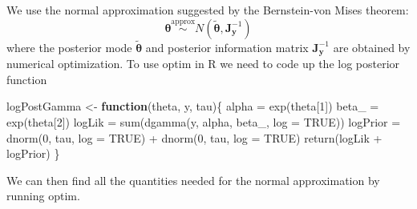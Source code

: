 \documentclass[
  letterpaper,
  DIV=11,
  numbers=noendperiod]{scrartcl}
\newenvironment{Shaded}{\begin{snugshade}}{\end{snugshade}}
\newcommand{\AttributeTok}[1]{\textcolor[rgb]{0.40,0.45,0.13}{#1}}
\newcommand{\ConstantTok}[1]{\textcolor[rgb]{0.56,0.35,0.01}{#1}}
\newcommand{\ControlFlowTok}[1]{\textcolor[rgb]{0.00,0.23,0.31}{\textbf{#1}}}
\newcommand{\DecValTok}[1]{\textcolor[rgb]{0.68,0.00,0.00}{#1}}
\newcommand{\FunctionTok}[1]{\textcolor[rgb]{0.28,0.35,0.67}{#1}}
\newcommand{\NormalTok}[1]{\textcolor[rgb]{0.00,0.23,0.31}{#1}}
\newcommand{\OtherTok}[1]{\textcolor[rgb]{0.00,0.23,0.31}{#1}}
\newcommand{\SpecialCharTok}[1]{\textcolor[rgb]{0.37,0.37,0.37}{#1}}
\begin{document}
\begin{tcolorbox}[enhanced jigsaw, arc=.35mm, bottomrule=.15mm, bottomtitle=1mm, breakable, colback=white, colbacktitle=quarto-callout-note-color!10!white, colframe=quarto-callout-note-color-frame, coltitle=black, left=2mm, leftrule=.75mm, opacityback=0, opacitybacktitle=0.6, rightrule=.15mm, title={Solution}, titlerule=0mm, toprule=.15mm, toptitle=1mm]

We use the normal approximation suggested by the Bernstein-von Mises
theorem: \[
\boldsymbol{\theta} \overset{\mathrm{approx}}{\sim} N(\tilde{\boldsymbol{\theta}}, \boldsymbol{J}^{-1}_{\mathbf{y}})
\] where the posterior mode \(\tilde{\boldsymbol{\theta}}\) and
posterior information matrix \(\boldsymbol{J}^{-1}_{\mathbf{y}}\) are
obtained by numerical optimization. To use optim in R we need to code up
the log posterior function

\begin{Shaded}
\begin{Highlighting}[]
\NormalTok{logPostGamma }\OtherTok{\textless{}{-}} \ControlFlowTok{function}\NormalTok{(theta, y, tau)\{}
\NormalTok{  alpha }\OtherTok{=} \FunctionTok{exp}\NormalTok{(theta[}\DecValTok{1}\NormalTok{])}
\NormalTok{  beta\_ }\OtherTok{=} \FunctionTok{exp}\NormalTok{(theta[}\DecValTok{2}\NormalTok{])}
\NormalTok{  logLik }\OtherTok{=} \FunctionTok{sum}\NormalTok{(}\FunctionTok{dgamma}\NormalTok{(y, alpha, beta\_, }\AttributeTok{log =} \ConstantTok{TRUE}\NormalTok{))}
\NormalTok{  logPrior }\OtherTok{=} \FunctionTok{dnorm}\NormalTok{(}\DecValTok{0}\NormalTok{, tau, }\AttributeTok{log =} \ConstantTok{TRUE}\NormalTok{) }\SpecialCharTok{+} \FunctionTok{dnorm}\NormalTok{(}\DecValTok{0}\NormalTok{, tau, }\AttributeTok{log =} \ConstantTok{TRUE}\NormalTok{)}
  \FunctionTok{return}\NormalTok{(logLik }\SpecialCharTok{+}\NormalTok{ logPrior)}
\NormalTok{\}}
\end{Highlighting}
\end{Shaded}

We can then find all the quantities needed for the normal approximation
by running optim.


\end{tcolorbox}
\end{document}
